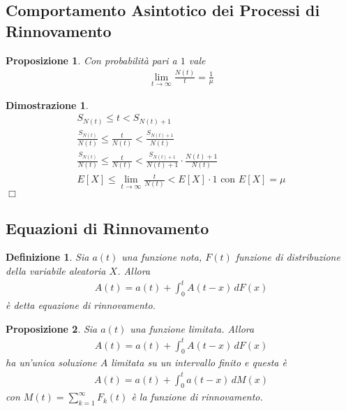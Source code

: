 \documentclass{article}
\newtheorem{definizione}{Definizione}[section]
\newtheorem{proposizione}{Proposizione}[section]
\newtheorem*{dimostrazione*}{Dimostrazione}
\newcommand*{\QED}{\hfill\ensuremath{\Box}}
\begin{document}
\subsection{Comportamento Asintotico dei Processi di Rinnovamento}

\begin{proposizione}
Con probabilità pari a $1$ vale
\begin{align}
\lim_{t\to\infty} \frac{N(t)}{t} = \frac{1}{\mu}
\end{align}
\end{proposizione}
\begin{dimostrazione*}
\begin{gather*}
S_{N(t)} \le t < S_{N(t) +1}\\
\frac{S_{N(t)}}{N(t)} \le \frac{t}{N(t)} < \frac{S_{N(t) +1}}{N(t)}\\
\frac{S_{N(t)}}{N(t)} \le \frac{t}{N(t)} < \frac{S_{N(t) +1}}{N(t)+1}\cdot\frac{N(t)+1}{N(t)}\\
E[X] \le \lim_{t\to\infty}\frac{t}{N(t)} < E[X]\cdot1 \text{ con } E[X] = \mu
\end{gather*}
\QED
\end{dimostrazione*}

\subsection{Equazioni di Rinnovamento}

\begin{definizione}
Sia $a(t)$ una funzione nota, $F(t)$ funzione di distribuzione della variabile aleatoria $X$. Allora
\begin{align*}
A(t) = a(t)+\int_0^tA(t-x)\,dF(x)
\end{align*}
è detta \emph{equazione di rinnovamento}.
\end{definizione}

\begin{proposizione}
\label{pr_proposizione_soluzione_equazione_rinnovamento}
Sia $a(t)$ una funzione limitata. Allora
\begin{align*}
A(t) = a(t)+\int_0^tA(t-x)\,dF(x)
\end{align*}
ha un'unica soluzione $A$ limitata su un intervallo finito e questa è
\begin{align*}
A(t) = a(t)+\int_0^ta(t-x)\,dM(x)
\end{align*}
con $M(t) = \sum_{k=1}^{\infty} F_k(t)$ è la funzione di rinnovamento.
\end{proposizione}
\end{document}
